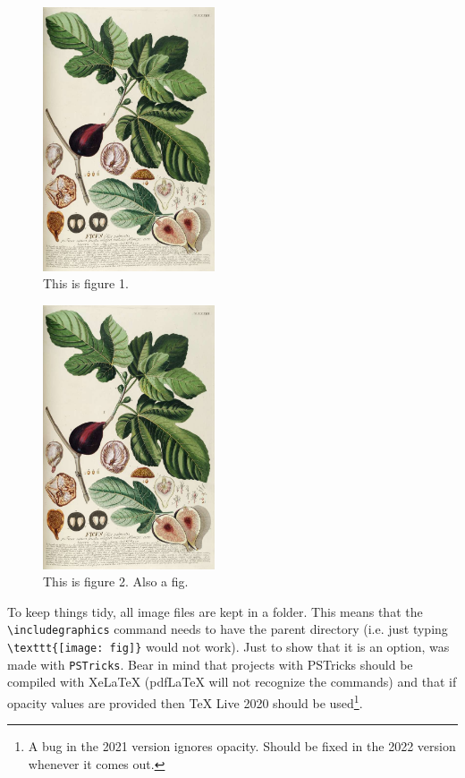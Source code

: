 \begin{figure}
\begin{center}
\includegraphics[width=2in]{images/fig}
\end{center}
\caption{This is figure 1.}
\label{fig1}
\end{figure}

\begin{figure}
\centering
\includegraphics[width=2in]{images/fig}
\caption{This is figure 2. Also a fig.}
\label{fig2}
\end{figure}

To keep things tidy, all image files are kept in a folder. This means that the \verb|\includegraphics| command needs to have the parent directory (i.e. just typing \verb|\texttt{[image: fig]}| would not work). Just to show that it is an option,  was made with \texttt{PSTricks}. Bear in mind that projects with PSTricks should be compiled with XeLaTeX (pdfLaTeX will not recognize the commands) and that if opacity values are provided then TeX Live 2020 should be used\footnote{A bug in the 2021 version ignores opacity. Should be fixed in the 2022 version whenever it comes out.}.

